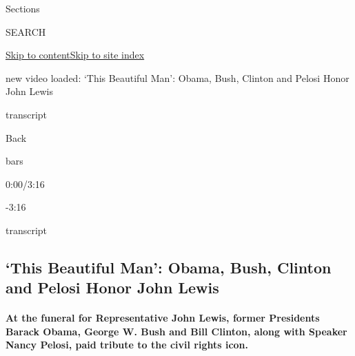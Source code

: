Sections

SEARCH

\protect\hyperlink{site-content}{Skip to
content}\protect\hyperlink{site-index}{Skip to site index}

new video loaded: `This Beautiful Man': Obama, Bush, Clinton and Pelosi
Honor John Lewis

transcript

Back

bars

0:00/3:16

-3:16

transcript

\hypertarget{this-beautiful-man-obama-bush-clinton-and-pelosi-honor-john-lewis}{%
\subsection{`This Beautiful Man': Obama, Bush, Clinton and Pelosi Honor
John
Lewis}\label{this-beautiful-man-obama-bush-clinton-and-pelosi-honor-john-lewis}}

\hypertarget{at-the-funeral-for-representative-john-lewis-former-presidents-barack-obama-george-w-bush-and-bill-clinton-along-with-speaker-nancy-pelosi-paid-tribute-to-the-civil-rights-icon}{%
\paragraph{At the funeral for Representative John Lewis, former
Presidents Barack Obama, George W. Bush and Bill Clinton, along with
Speaker Nancy Pelosi, paid tribute to the civil rights
icon.}\label{at-the-funeral-for-representative-john-lewis-former-presidents-barack-obama-george-w-bush-and-bill-clinton-along-with-speaker-nancy-pelosi-paid-tribute-to-the-civil-rights-icon}}

